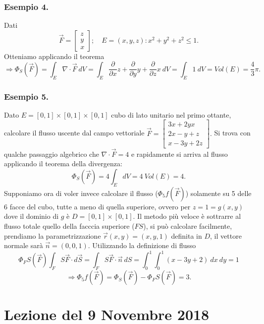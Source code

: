 \documentclass[10pt]{article}
\theoremstyle{plain}
\theoremstyle{definition}
\begin{document}
\subsubsection{Esempio 4.}
Dati
$$\vec{F}=\begin{bmatrix}
z\\ y \\  x
\end{bmatrix}; \quad E = {(x,y,z): x^2+y^2+z^2 \leq 1} .$$
Otteniamo applicando il teorema
$$\Longrightarrow \Phi_S(\vec{F})= \int_E  \nabla \cdot \vec{F}\ dV =
\int_E \frac{\partial}{\partial x} z+ \frac{\partial }{\partial y}y + \frac{\partial }{\partial z}x\ dV =  \int_E  1\ dV = Vol(E) = \frac{4}{3}\pi.$$

\subsubsection{Esempio 5.}
Dato $E=[0,1]\times [0,1]\times [0,1]$ cubo di lato unitario nel primo ottante, calcolare il flusso uscente dal campo vettoriale $\vec{F}=
\begin{bmatrix}
3x+2yx
\\ 2x-y+z
\\ x-3y+2z
\end{bmatrix}.$
Si trova con qualche passaggio algebrico che $\nabla\cdot\vec{F}=4$ e rapidamente si arriva al flusso applicando il teorema della divergenza:
$$\Phi_S(\vec{F})=4\int_EdV= 4\ Vol(E)=4.
$$
Supponiamo ora di voler invece calcolare il flusso ($\Phi_5f(\vec{F})$) solamente su 5 delle 6 facce del cubo, tutte a meno di quella superiore, ovvero per $z=1 = g(x,y)$ dove il dominio di $g$ è $D=[0,1]\times [0,1]$. Il metodo più veloce è sottrarre al flusso totale quello della facccia superiore ($FS$), si può calcolare facilmente, prendiamo la parametrizzazione $\vec{r}(x,y)=(x,y,1)$ definita in $D$, il vettore normale sarà $\vec{n}=(0,0,1)$. Utilizzando la definizione di flusso
$$\Phi_FS(\vec{F})\int_FS\vec{F}\cdot d\vec{S} = \int_FS\vec{F}\cdot\vec{n}\ dS = \int_0^1 \int_0^1 (x-3y+2)\ dx\ dy =1$$ $$ \Longrightarrow \Phi_5f(\vec{F}) = \Phi_S(\vec{F}) -\Phi_FS(\vec{F}) =3. 
$$


\section{Lezione del 9 Novembre 2018}
\end{document}
